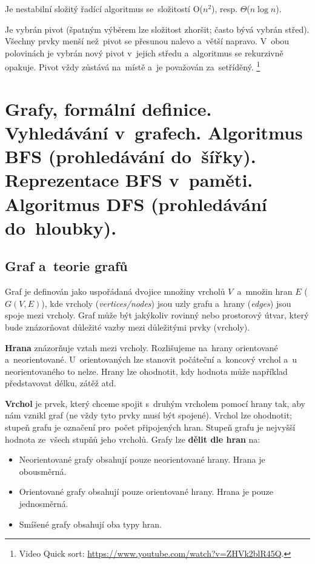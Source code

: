 Je nestabilní složitý řadící algoritmus se~složitostí O($n^2$), resp. $\Theta$($n\log{n}$).

Je vybrán pivot (špatným výběrem lze složitost zhoršit; často bývá vybrán střed). Všechny prvky menší než~pivot se přesunou nalevo a~větší napravo. V~obou polovinách je vybrán nový pivot v~jejich středu a~algoritmus se rekurzivně opakuje. Pivot vždy zůstává na~místě a~je považován za~setříděný.%
\footnote{Video Quick sort: \url{https://www.youtube.com/watch?v=ZHVk2blR45Q}.}

\clearpage
\section{Grafy, formální definice. Vyhledávání v~grafech. Algoritmus BFS (prohledávání do~šířky). Reprezentace BFS v~paměti. Algoritmus DFS (prohledávání do~hloubky).}

\subsection{Graf a~teorie grafů}

Graf je definován jako uspořádaná dvojice množiny vrcholů $V$~a~množin hran $E$ ($G(V,E)$), kde vrcholy (\emph{vertices/nodes}) jsou uzly grafu a~hrany (\emph{edges}) jsou spoje mezi vrcholy. Graf může být jakýkoliv rovinný nebo prostorový útvar, který bude znázorňovat důležité vazby mezi důležitými prvky (vrcholy).

\textbf{Hrana} znázorňuje vztah mezi vrcholy. Rozlišujeme na~hrany orientované a~neorientované. U~orientovaných lze stanovit počáteční a~koncový vrchol a~u neorientovaného to nelze. Hrany lze ohodnotit, kdy hodnota může například představovat délku, zátěž atd.

\textbf{Vrchol} je prvek, který chceme spojit s~druhým vrcholem pomocí hrany tak, aby nám vznikl graf (ne vždy tyto prvky musí být spojené). Vrchol lze ohodnotit; stupeň grafu je označení pro~počet připojených hran. Stupeň grafu je nejvyšší hodnota ze~všech stupňů jeho vrcholů. Grafy lze \textbf{dělit dle hran} na:

\begin{itemize}
	\item Neorientované grafy obsahují pouze neorientované hrany. Hrana je obousměrná.
	\item Orientované grafy obsahují pouze orientované hrany. Hrana je pouze jednosměrná.
	\item Smíšené grafy obsahují oba typy hran.
\end{itemize}

